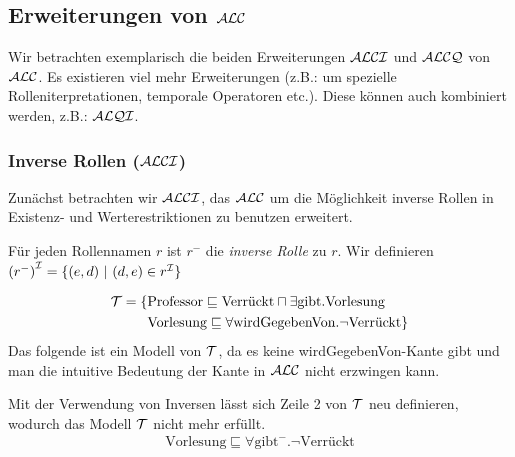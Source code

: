 \subsection{Erweiterungen von \texorpdfstring{$\mathcal{A}\mathcal{L}\mathcal{C}$}{ALC}}\label{erweiterungen-von-alc}

Wir betrachten exemplarisch die beiden Erweiterungen $\mathcal{A}\mathcal{L}\mathcal{C}\mathcal{I}$ und $\mathcal{A}\mathcal{L}\mathcal{C}\mathcal{Q}$ von $\mathcal{A}\mathcal{L}\mathcal{C}$. Es existieren viel mehr Erweiterungen (z.B.: um spezielle Rolleniterpretationen, temporale Operatoren etc.). Diese können auch kombiniert werden, z.B.: $\mathcal{A}\mathcal{L}\mathcal{Q}\mathcal{I}$.

\subsubsection{Inverse Rollen (\texorpdfstring{$\mathcal{A}\mathcal{L}\mathcal{C}\mathcal{I}$}{ALCI})}\label{inverse-rollen-alci}

Zunächst betrachten wir $\mathcal{A}\mathcal{L}\mathcal{C}\mathcal{I}$, das $\mathcal{A}\mathcal{L}\mathcal{C}$ um die Möglichkeit inverse Rollen in Existenz- und Werterestriktionen zu benutzen erweitert.

\begin{definition}
Für jeden Rollennamen $r$ ist $r^{-}$ die \emph{inverse
Rolle} zu $r$. Wir definieren
$\left( r^{-} \right)^\MI = \left\{ \left( e,d \right)\  \right|\ \left( d,e \right) \in r^\MI\}$
\end{definition}

\begin{tafel}
    \begin{align*}
        \mathcal{T} = \{& \text{Professor} \sqsubseteq \text{Verrückt} \sqcap \exists  \text{gibt}.\text{Vorlesung}\\
                & \text{Vorlesung} \sqsubseteq \forall \text{wirdGegebenVon}.\neg\text{Verrückt}\}
    \end{align*}
    Das folgende ist ein Modell von $\mathcal{T}$, da es keine wirdGegebenVon-Kante gibt und man die intuitive Bedeutung der Kante in $\mathcal{A}\mathcal{L}\mathcal{C}$ nicht erzwingen kann.
    \begin{center}
    \end{center}
    Mit der Verwendung von Inversen lässt sich Zeile 2 von $\mathcal{T}$ neu definieren, wodurch das Modell $\mathcal{T}$ nicht mehr erfüllt.
    \begin{align*}
        \text{Vorlesung} \sqsubseteq \forall \text{gibt}^-.\neg\text{Verrückt}
    \end{align*}
\end{tafel}

